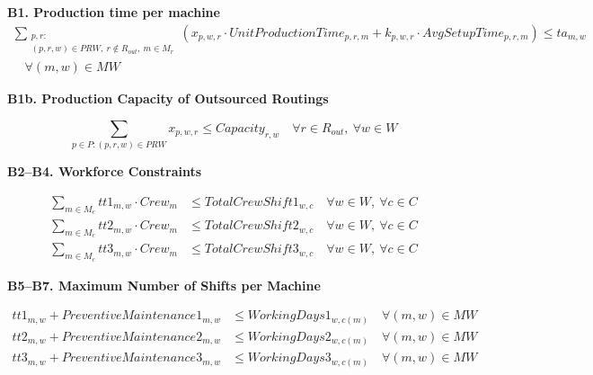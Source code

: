 \documentclass{article}
\begin{document}
\noindent\text{---------------------------------------------------------------------------------------------------------}



\noindent\textbf{B1. Production time per machine}
\begin{equation}
\begin{gathered}
\sum_{\substack{p,r : \\ (p,r,w) \in PRW,\ r \notin R_{out},\ 
m \in M_r}} 
\left( x_{p,w,r} \cdot UnitProductionTime_{p,r,m} + 
k_{p,w,r} \cdot AvgSetupTime_{p,r,m} \right)
\leq ta_{m,w} \\
\quad \forall (m,w) \in MW
\label{eq:B1}
\end{gathered}
\end{equation}

\noindent\textbf{B1b. Production Capacity of Outsourced Routings}

\begin{equation}
\sum_{p \in P : (p,r,w) \in PRW} x_{p,w,r} \leq Capacity_{r,w}
\quad \forall r \in R_{out},\ \forall w \in W
\label{eq:B1b}
\end{equation}

    
\noindent\textbf{B2--B4. Workforce Constraints}

\begin{align}
\sum_{m \in M_c} tt1_{m,w} \cdot Crew_m &\leq TotalCrewShift1_{w,c}
\quad \forall w \in W,\ \forall c \in C \label{eq:B2}\\
\sum_{m \in M_c} tt2_{m,w} \cdot Crew_m &\leq TotalCrewShift2_{w,c}
\quad \forall w \in W,\ \forall c \in C \label{eq:B3}\\
\sum_{m \in M_c} tt3_{m,w} \cdot Crew_m &\leq TotalCrewShift3_{w,c}
\quad \forall w \in W,\ \forall c \in C \label{eq:B4}
\end{align}




\noindent\textbf{B5--B7. Maximum Number of Shifts per Machine}

\begin{align}
tt1_{m,w} + PreventiveMaintenance1_{m,w} &\leq 
WorkingDays1_{w,c(m)}
\quad \forall (m,w) \in MW \label{eq:B5}\\
tt2_{m,w} + PreventiveMaintenance2_{m,w} &\leq 
WorkingDays2_{w,c(m)}
\quad \forall (m,w) \in MW \label{eq:B6}\\
tt3_{m,w} + PreventiveMaintenance3_{m,w} &\leq 
WorkingDays3_{w,c(m)}
\quad \forall (m,w) \in MW \label{eq:B7}
\end{align}
\end{document}
